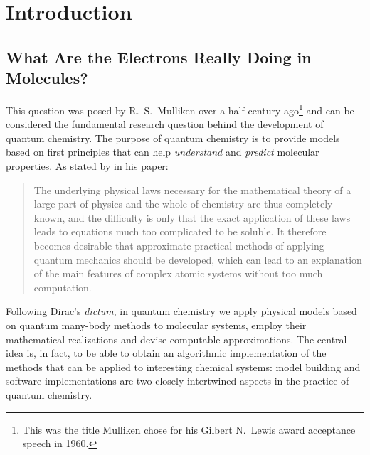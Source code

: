 \chapter*{Introduction}
{}

\renewcommand{\thefigure}{\Alph{figure}}

\begin{epigraphs}
\setlength\epigraphwidth{7.5cm}
\setlength\epigraphwidth{7cm}
\end{epigraphs}


\section*{What Are the Electrons Really Doing in Molecules?}

This question was posed by R.~S.~Mulliken over a half-century
ago\footnote{This was the title Mulliken chose for his Gilbert N.~Lewis
award acceptance speech in 1960.}
and can be considered the fundamental research question behind the
development of quantum chemistry.
The purpose of quantum chemistry is to provide models based on first
principles that can help \emph{understand} and \emph{predict} molecular properties.
As stated by \citeauthor{Dirac1929-gn} in his 
paper:\autocite{Dirac1929-gn, Kutzelnigg2000-fl}
\blockquote{The underlying physical laws necessary for the mathematical
theory of a large part of physics and the whole of chemistry are thus
completely known, and the difficulty is only that the exact application of
these laws leads to equations much too complicated to be soluble. It
therefore becomes desirable that approximate practical methods of
applying quantum mechanics should be developed, which can lead to an
explanation of the main features of complex atomic systems without too
much computation.}
Following Dirac's \emph{dictum}, in quantum chemistry we apply physical
models based on quantum many-body methods to molecular systems, employ
their mathematical realizations and devise computable approximations.
The central idea is, in fact, to be able to obtain an algorithmic
implementation of the methods that can be applied to interesting
chemical systems: model building and software implementations are two
closely intertwined aspects in the practice of quantum chemistry.

